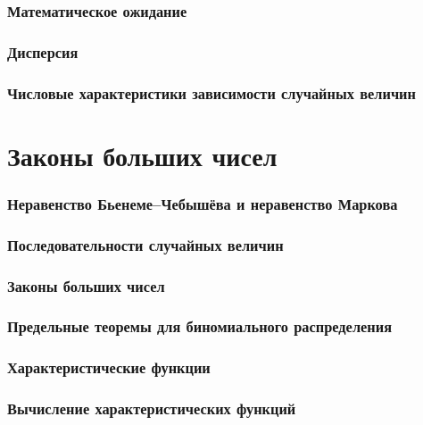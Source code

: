 \documentclass[a4paper,14pt]{extarticle}
\begin{document}
\section{Математическое ожидание} 

\section{Дисперсия} 

\section{Числовые характеристики зависимости
случайных величин} 

\part{Законы больших чисел}

\section{Неравенство Бьенеме–Чебышёва и
неравенство Маркова}

\section{Последовательности случайных величин}


\section{Законы больших чисел} 

\section{Предельные теоремы для
биномиального распределения} 

\section{Характеристические функции}

\section{Вычисление характеристических
функций}
\end{document}

